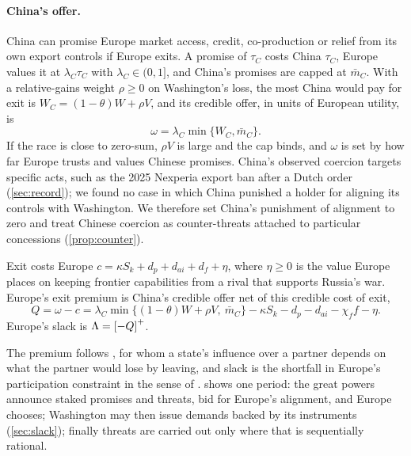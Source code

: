 \paragraph{China's offer.} China can promise Europe market access, credit, co-production or relief from its own export controls if Europe exits. A promise of $\tau_C$ costs China $\tau_C$, Europe values it at $\lambda_C\tau_C$ with $\lambda_C\in(0,1]$, and China's promises are capped at $\bar m_C$. With a relative-gains weight $\rho\ge 0$ on Washington's loss, the most China would pay for exit is $W_C=(1-\theta)W+\rho V$, and its credible offer, in units of European utility, is
\begin{equation}\label{eq:omega}
\omega=\lambda_C\min\{W_C,\bar m_C\}.
\end{equation}
If the race is close to zero-sum, $\rho V$ is large and the cap binds, and $\omega$ is set by how far Europe trusts and values Chinese promises. China's observed coercion targets specific acts, such as the 2025 Nexperia export ban after a Dutch order (\cref{sec:record}); we found no case in which China punished a holder for aligning its controls with Washington. We therefore set China's punishment of alignment to zero and treat Chinese coercion as counter-threats attached to particular concessions (\cref{prop:counter}).

\begin{definition}\label{def:Q}
Exit costs Europe $c=\kappa S_k+d_p+d_{ai}+d_f+\eta$, where $\eta\ge 0$ is the value Europe places on keeping frontier capabilities from a rival that supports Russia's war. Europe's exit premium is China's credible offer net of this credible cost of exit,
\begin{equation}\label{eq:Q}
Q=\omega-c=\lambda_C\min\{(1-\theta)W+\rho V,\ \bar m_C\}-\kappa S_k-d_p-d_{ai}-\chi_f f-\eta .
\end{equation}
Europe's slack is $\Lambda=\left[-Q\right]^{+}$.
\end{definition}

The premium follows \citet{hirschman1945national}, for whom a state's influence over a partner depends on what the partner would lose by leaving, and slack is the shortfall in Europe's participation constraint in the sense of \citet{clayton2026putting}.  shows one period: the great powers announce staked promises and threats, bid for Europe's alignment, and Europe chooses; Washington may then issue demands backed by its instruments (\cref{sec:slack}); finally threats are carried out only where that is sequentially rational.

